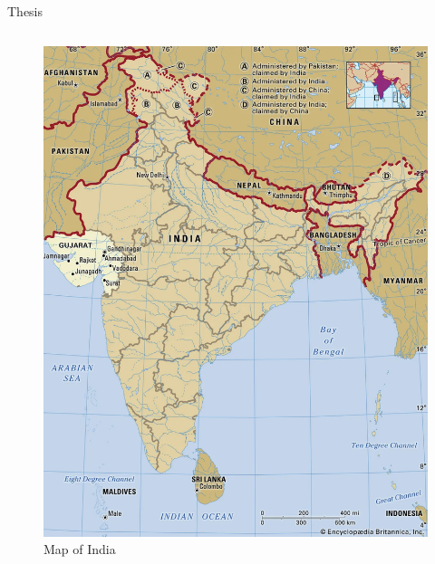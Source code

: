 \documentclass[10pt]{beamer}
\begin{document}
\begin{frame}{Thesis}
\begin{columns}
		\begin{column}{0.3\textwidth}
			\centering
			\begin{figure}
				\centering
				\includegraphics[width=1\textwidth]{gujarat.png}
				\caption{Map of India}
			\end{figure}
		\end{column}
	\end{columns}
\end{frame}
\end{document}
